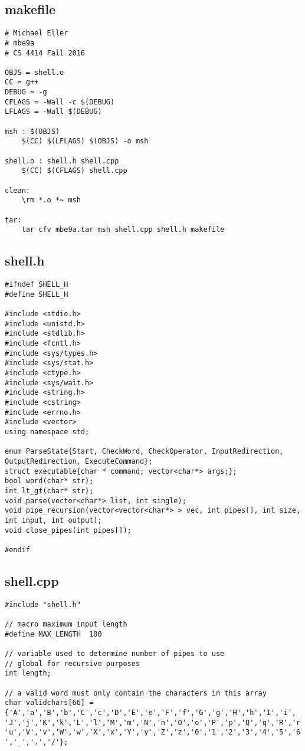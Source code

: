 \documentclass[12pt,letter,titlepage]{article}
\begin{document}
\subsection*{makefile}{
\scriptsize{
\begin{verbatim}
# Michael Eller
# mbe9a
# CS 4414 Fall 2016

OBJS = shell.o
CC = g++
DEBUG = -g
CFLAGS = -Wall -c $(DEBUG)
LFLAGS = -Wall $(DEBUG)

msh : $(OBJS)
	$(CC) $(LFLAGS) $(OBJS) -o msh

shell.o : shell.h shell.cpp
	$(CC) $(CFLAGS) shell.cpp

clean:
	\rm *.o *~ msh

tar:
	tar cfv mbe9a.tar msh shell.cpp shell.h makefile
\end{verbatim}

\subsection*{shell.h}{
\scriptsize{
\begin{verbatim}
#ifndef SHELL_H
#define SHELL_H

#include <stdio.h>
#include <unistd.h>
#include <stdlib.h>
#include <fcntl.h>
#include <sys/types.h>
#include <sys/stat.h>
#include <ctype.h>
#include <sys/wait.h>
#include <string.h>
#include <cstring>
#include <errno.h>
#include <vector>
using namespace std;

enum ParseState{Start, CheckWord, CheckOperator, InputRedirection, OutputRedirection, ExecuteCommand};
struct executable{char * command; vector<char*> args;};
bool word(char* str);
int lt_gt(char* str);
void parse(vector<char*> list, int single);
void pipe_recursion(vector<vector<char*> > vec, int pipes[], int size, int input, int output);
void close_pipes(int pipes[]);

#endif
\end{verbatim}
}
\pagebreak
\subsection*{shell.cpp}{
\scriptsize{
\begin{verbatim}
#include "shell.h"

// macro maximum input length
#define MAX_LENGTH	100

// variable used to determine number of pipes to use
// global for recursive purposes
int length;

// a valid word must only contain the characters in this array
char validchars[66] = {'A','a','B','b','C','c','D','E','e','F','f','G','g','H','h','I','i',
'J','j','K','k','L','l','M','m','N','n','O','o','P','p','Q','q','R','r','S','s','T','t','U',
'u','V','v','W','w','X','x','Y','y','Z','z','0','1','2','3','4','5','6','7','8','9','-','_','.','/'};


\end{verbatim}}}}}}
\end{document}
